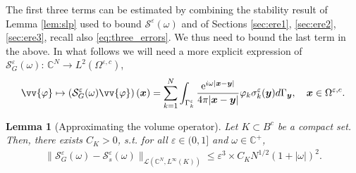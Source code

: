 \documentclass[]{article}
\newtheorem{lemma}{Lemma}
\numberwithin{equation}{section}
\numberwithin{theorem}{section}
\numberwithin{lemma}{section}
\numberwithin{corollary}{section}
\numberwithin{proposition}{section}
\numberwithin{definition}{section}
\newcommand{\bx}{\boldsymbol{x}}
\newcommand{\by}{\boldsymbol{y}}
\newcommand{\re}{\varepsilon}
\renewcommand{\vec}{\boldsymbol}
\begin{document}
	The first three terms can be estimated by combining the stability result of Lemma \ref{lem:slp} used to bound $\mathcal{S}^{\re}(\omega)$ and of Sections \ref{sec:ere1}, \ref{sec:ere2}, \ref{sec:ere3}, recall also \eqref{eq:three_errors}. We thus need to bound the last term in the above. In what follows we will need a more explicit expression of $\mathcal{S}^{\re}_G(\omega): \, \mathbb{C}^N\rightarrow L^2(\Omega^{\re,c})$,
	\begin{align*}%
		\vv{\varphi} \mapsto 	\left(\mathcal{S}^{\re}_G(\omega)\vv{\varphi}\right)(\vec{x})=\sum\limits_{k=1}^N\int_{\Gamma^{\re}_k}\frac{\mathrm{e}^{i\omega|\bx-\by|}}{4\pi|\bx-\by|}\varphi_k\sigma_k^{\re}(\vec{y})d\Gamma_{\vec{y}}, \quad \vec{x}\in \Omega^{\re,c}.
	\end{align*}
	\begin{lemma}[Approximating the volume operator]
		\label{lem:appx_slp_vol}
		Let $K\subset B^c$ be a compact set. Then, there exists $C_K>0$, s.t. for all $\re\in(0,1]$ and $\omega\in \mathbb{C}^+$,
		\begin{align*}%
			\|\mathcal{S}^{\re}_G(\omega)-	\mathcal{S}^{\re}_{s}(\omega)\|_{\mathcal{L}(\mathbb{C}^N, L^{\infty}(K))}\leq \varepsilon^3 \times C_K N^{1/2} (1+|\omega|)^2 .
		\end{align*}
	\end{lemma}
	
\end{document}
